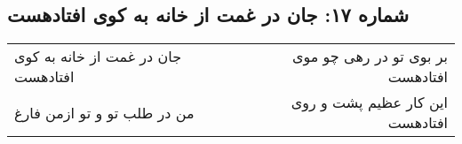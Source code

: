 \begin{center}
\section*{شماره ۱۷: جان در غمت از خانه به کوی افتادهست}
\label{sec:017}
\begin{longtable}{l p{0.5cm} r}
جان در غمت از خانه به کوی افتادهست
&&
بر بوی تو در رهی چو موی افتادهست
\\
من در طلب تو و تو ازمن فارغ
&&
این کار عظیم پشت و روی افتادهست
\\
\end{longtable}
\end{center}
